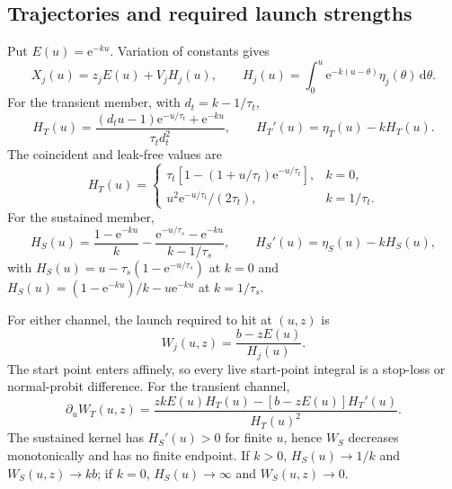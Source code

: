 \documentclass[12pt]{article}
\newcommand{\dd}{\,\mathrm{d}}
\newcommand{\e}{\mathrm{e}}
\theoremstyle{remark}
\begin{document}
\subsection{Trajectories and required launch strengths}
Put $E(u)=\e^{-ku}$.  Variation of constants gives
\begin{equation}
  X_j(u)=z_jE(u)+V_jH_j(u),
  \qquad
  H_j(u)=\int_0^u\e^{-k(u-\theta)}\eta_j(\theta)\dd\theta .
  \label{eq:btawl-traj}
\end{equation}
For the transient member, with $d_t=k-1/\tau_t$,
\begin{equation}
  H_T(u)=
  \frac{(d_tu-1)\e^{-u/\tau_t}+\e^{-ku}}{\tau_t d_t^2},
  \qquad
  H_T'(u)=\eta_T(u)-kH_T(u).
  \label{eq:btawl-K}
\end{equation}
The coincident and leak-free values are
\begin{equation}
  H_T(u)=
  \begin{cases}
    \tau_t[1-(1+u/\tau_t)\e^{-u/\tau_t}],& k=0,\\[2pt]
    u^2\e^{-u/\tau_t}/(2\tau_t),& k=1/\tau_t .
  \end{cases}
  \label{eq:btawl-K-special}
\end{equation}
For the sustained member,
\begin{equation}
  H_S(u)=\frac{1-\e^{-ku}}{k}
       -\frac{\e^{-u/\tau_s}-\e^{-ku}}{k-1/\tau_s},
  \qquad
  H_S'(u)=\eta_S(u)-kH_S(u),
  \label{eq:btawl-sustained}
\end{equation}
with $H_S(u)=u-\tau_s(1-\e^{-u/\tau_s})$ at $k=0$ and $H_S(u)=(1-\e^{-ku})/k-u\e^{-ku}$ at $k=1/\tau_s$.

For either channel, the launch required to hit at $(u,z)$ is
\begin{equation}
  W_j(u,z)=\frac{b-zE(u)}{H_j(u)}.
  \label{eq:btawl-vstar}
\end{equation}
The start point enters affinely, so every live start-point integral is a stop-loss or normal-probit difference.  For the transient channel,
\begin{equation}
  \partial_u W_T(u,z)
   =\frac{zkE(u)H_T(u)-[b-zE(u)]H_T'(u)}{H_T(u)^2}.
  \label{eq:btawl-vstar-derivative}
\end{equation}
The sustained kernel has $H_S'(u)>0$ for finite $u$, hence $W_S$ decreases monotonically and has no finite endpoint.  If $k>0$, $H_S(u)\to1/k$ and $W_S(u,z)\to kb$; if $k=0$, $H_S(u)\to\infty$ and $W_S(u,z)\to0$.
\end{document}
